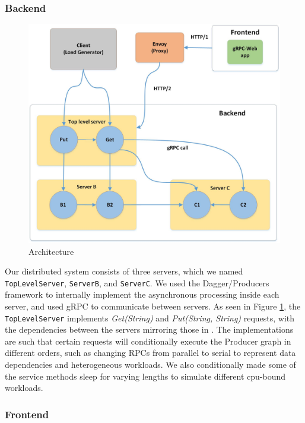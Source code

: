 \documentclass[11pt, twoside, twocolumn]{extarticle}
\begin{document}
\subsubsection*{Backend}

\begin{figure}[h]
\includegraphics[width=\linewidth]{architecture.jpg}
\caption{Architecture}
\label{fig:architecture}
\end{figure}

Our distributed system consists of three servers, which we named \lstinline{TopLevelServer}, \lstinline{ServerB}, and \lstinline{ServerC}. We used the Dagger/Producers framework to internally implement the asynchronous processing inside each server, and used gRPC to communicate between servers.  As seen in Figure \ref{fig:architecture}, the \lstinline{TopLevelServer} implements \textit{Get(String)} and \textit{Put(String, String)} requests, with the dependencies between the servers mirroring those in \cite{10.1145/3526967}.  The implementations are such that certain requests will conditionally execute the Producer graph in different orders, such as changing RPCs from parallel to serial to represent data dependencies and heterogeneous workloads. We also conditionally made some of the service methods sleep for varying lengths to simulate different cpu-bound workloads.

\subsubsection*{Frontend}
\end{document}
